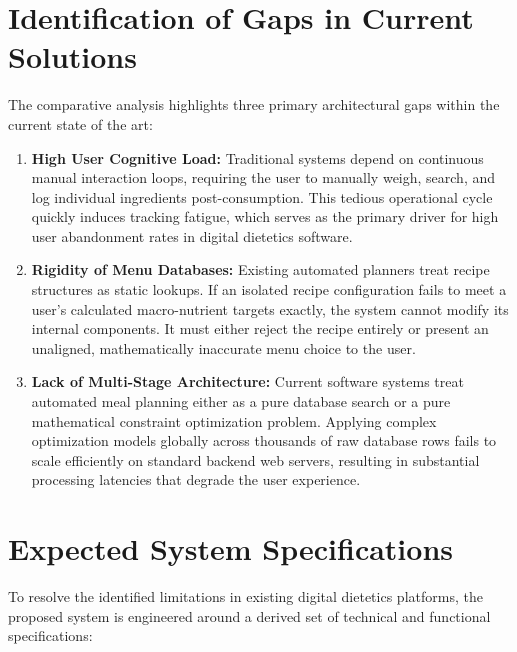 \section{Identification of Gaps in Current Solutions}

The comparative analysis highlights three primary architectural gaps within the current 
state of the art:

\begin{enumerate}
    \item \textbf{High User Cognitive Load:} Traditional systems depend on continuous 
    manual interaction loops, requiring the user to manually weigh, search, and log 
    individual ingredients post-consumption. This tedious operational cycle quickly 
    induces tracking fatigue, which serves as the primary driver for high user abandonment 
    rates in digital dietetics software.
    \item \textbf{Rigidity of Menu Databases:} Existing automated planners treat recipe 
    structures as static lookups. If an isolated recipe configuration fails to meet a 
    user's calculated macro-nutrient targets exactly, the system cannot modify its internal 
    components. It must either reject the recipe entirely or present an unaligned, 
    mathematically inaccurate menu choice to the user.
    \item \textbf{Lack of Multi-Stage Architecture:} Current software systems treat 
    automated meal planning either as a pure database search or a pure mathematical 
    constraint optimization problem. Applying complex optimization models globally 
    across thousands of raw database rows fails to scale efficiently on standard backend 
    web servers, resulting in substantial processing latencies that degrade the user 
    experience.
\end{enumerate}

\section{Expected System Specifications}

To resolve the identified limitations in existing digital 
dietetics platforms, the proposed system is engineered around a 
derived set of technical and functional specifications:

